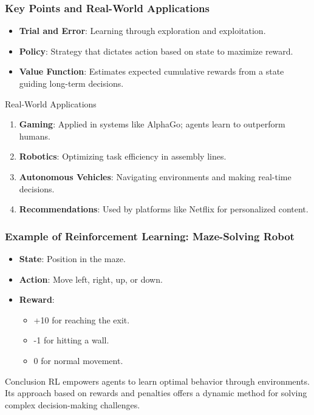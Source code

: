 \documentclass[aspectratio=169]{beamer}
\begin{document}
\begin{frame}[fragile]
    \frametitle{Key Points and Real-World Applications}
    \begin{itemize}
        \item \textbf{Trial and Error}: Learning through exploration and exploitation.
        \item \textbf{Policy}: Strategy that dictates action based on state to maximize reward.
        \item \textbf{Value Function}: Estimates expected cumulative rewards from a state guiding long-term decisions.
    \end{itemize}
    
    \begin{block}{Real-World Applications}
        \begin{enumerate}
            \item \textbf{Gaming}: Applied in systems like AlphaGo; agents learn to outperform humans.
            \item \textbf{Robotics}: Optimizing task efficiency in assembly lines.
            \item \textbf{Autonomous Vehicles}: Navigating environments and making real-time decisions.
            \item \textbf{Recommendations}: Used by platforms like Netflix for personalized content.
        \end{enumerate}
    \end{block}
\end{frame}

\begin{frame}[fragile]
    \frametitle{Example of Reinforcement Learning: Maze-Solving Robot}
    \begin{itemize}
        \item \textbf{State}: Position in the maze.
        \item \textbf{Action}: Move left, right, up, or down.
        \item \textbf{Reward}:
        \begin{itemize}
            \item +10 for reaching the exit.
            \item -1 for hitting a wall.
            \item 0 for normal movement.
        \end{itemize}
    \end{itemize}
    
    \begin{block}{Conclusion}
        RL empowers agents to learn optimal behavior through environments. Its approach based on rewards and penalties offers a dynamic method for solving complex decision-making challenges.
    \end{block}
\end{frame}
\end{document}
